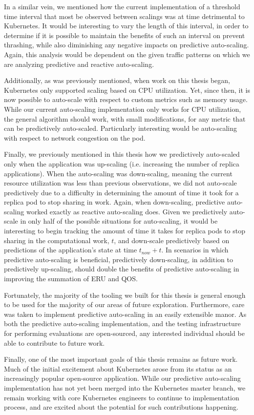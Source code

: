 In a similar vein, we mentioned how the current implementation of a threshold time
interval that most be observed between scalings was at time detrimental to
Kubernetes. It would be interesting to vary the length of this interval, in
order to determine if it is possible to maintain the benefits of such an interval on prevent
thrashing, while also diminishing any negative impacts on predictive
auto-scaling. Again, this analysis would be dependent on the given traffic
patterns on which we are analyzing predictive and reactive auto-scaling.

Additionally, as was previously mentioned, when work on this thesis began,
Kubernetes only supported scaling based on CPU utilization. Yet, since then, it
is now possible to auto-scale with respect to custom metrics such as memory
usage. While our current auto-scaling implementation only works for CPU
utilization, the general algorithm should work, with small modifications, for
any metric that can be predictively auto-scaled. Particularly interesting would
be auto-scaling with respect to network congestion on the pod.

Finally, we previously mentioned in this thesis how we predictively auto-scaled
only when the application was up-scaling (i.e. increasing the number of replica
applications). When the auto-scaling was down-scaling, meaning the current
resource utilization was less than previous observations, we did not auto-scale
predictively due to a difficulty in determining the amount of time it took for a
replica pod to stop sharing in work. Again, when down-scaling, predictive
auto-scaling worked exactly as reactive auto-scaling does. Given we predictively
auto-scale in only half of the possible situations for auto-scaling, it would be
interesting to begin tracking the amount of time it takes for replica pods to
stop sharing in the computational work, $t$, and down-scale predictively based on
predictions of the application's state at time $t_{now} + t$. In scenarios in
which predictive auto-scaling is beneficial, predictively down-scaling, in
addition to predictively up-scaling, should double the benefits of predictive
auto-scaling in improving the summation of ERU and QOS.

Fortunately, the majority of the tooling we built for this thesis is general
enough to be used for the majority of our areas of future exploration.
Furthermore, care was taken to implement predictive auto-scaling in an easily
extensible manor. As both the predictive auto-scaling implementation, and the
testing infrastructure for performing evaluations are open-sourced, any
interested individual should be able to contribute to future work.

Finally, one of the most important goals of this thesis remains as future work.
Much of the initial excitement about Kubernetes arose from its status as an
increasingly popular open-source application. While our predictive auto-scaling
implementation has not yet been merged into the Kubernetes master branch, we
remain working with core Kubernetes engineers to continue to implementation
process, and are excited about the potential for such contributions happening.
